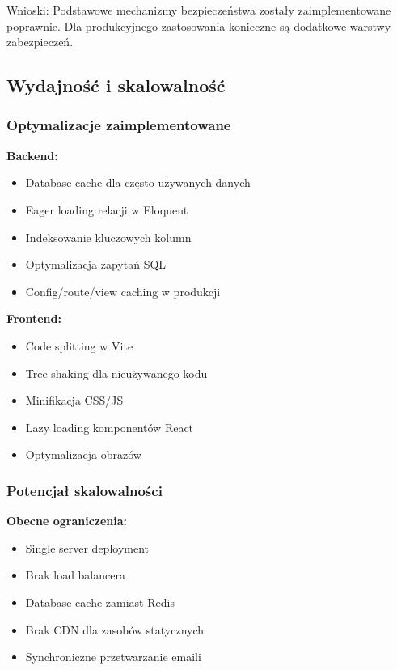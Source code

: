 \documentclass[12pt,a4paper]{article}
\begin{document}
    Wnioski: Podstawowe mechanizmy bezpieczeństwa zostały zaimplementowane poprawnie. Dla produkcyjnego zastosowania konieczne są dodatkowe warstwy zabezpieczeń.

    \subsection{Wydajność i skalowalność}

    \subsubsection{Optymalizacje zaimplementowane}

    \textbf{Backend:}
    \begin{itemize}
        \item Database cache dla często używanych danych
        \item Eager loading relacji w Eloquent
        \item Indeksowanie kluczowych kolumn
        \item Optymalizacja zapytań SQL
        \item Config/route/view caching w produkcji
    \end{itemize}

    \textbf{Frontend:}
    \begin{itemize}
        \item Code splitting w Vite
        \item Tree shaking dla nieużywanego kodu
        \item Minifikacja CSS/JS
        \item Lazy loading komponentów React
        \item Optymalizacja obrazów
    \end{itemize}

    \subsubsection{Potencjał skalowalności}

    \textbf{Obecne ograniczenia:}
    \begin{itemize}
        \item Single server deployment
        \item Brak load balancera
        \item Database cache zamiast Redis
        \item Brak CDN dla zasobów statycznych
        \item Synchroniczne przetwarzanie emaili
    \end{itemize}
\end{document}
